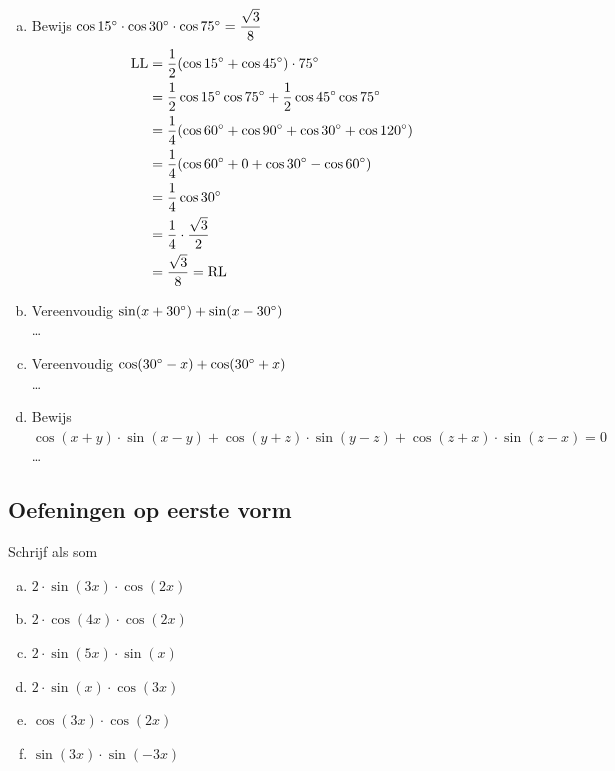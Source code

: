 \documentclass[a4paper,12pt]{article}
\begin{document}
\begin{enumerate}[(a)]
  \item Bewijs $\cos 15^\circ \cdot \cos 30^\circ \cdot \cos 75^\circ = \dfrac{\sqrt{3}}{8}$
  \begin{align*}
    \mbox{LL} &= \dfrac{1}{2}(\cos 15^\circ + \cos 45^\circ)\cdot 75^\circ\\
              &= \dfrac{1}{2}\cos 15^\circ \cos 75^\circ + \dfrac{1}{2}\cos 45^\circ \cos 75^\circ\\
              &= \dfrac{1}{4}(\cos 60^\circ + \cos 90^\circ + \cos 30^\circ + \cos 120^\circ)\\
              &= \dfrac{1}{4}(\cos 60^\circ + 0 + \cos 30^\circ - \cos 60^\circ)\\
              &= \dfrac{1}{4}\cos 30^\circ\\
              &= \dfrac{1}{4}\cdot\dfrac{\sqrt{3}}{2}\\
              &= \dfrac{\sqrt{3}}{8} = \mbox{RL}
  \end{align*}
  \item Vereenvoudig $\sin(x+30^\circ)+\sin(x-30^\circ)$\\
  \ldots
  \item Vereenvoudig $\cos(30^\circ-x)+\cos(30^\circ+x)$\\
  \ldots
  \item Bewijs $\cos(x+y)\cdot\sin(x-y)+\cos(y+z)\cdot\sin(y-z)+\cos(z+x)\cdot\sin(z-x)=0$\\
  \ldots
\end{enumerate}

\pagebreak
\subsection{Oefeningen op eerste vorm}

\begin{oefening}
Schrijf als som
\begin{enumerate}[(a)]
\itemsep.5em
  \item $2\cdot \sin(3x)\cdot \cos(2x)$
  \item $2\cdot \cos(4x)\cdot \cos(2x)$
  \item $2\cdot \sin(5x)\cdot \sin(x)$
  \item $2\cdot \sin(x)\cdot \cos(3x)$
  \item $\cos(3x)\cdot \cos(2x)$
  \item $\sin(3x)\cdot \sin(-3x)$
\end{enumerate}
\end{oefening}
\end{document}
